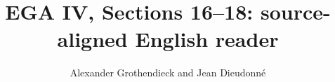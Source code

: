 
\setlength{\emergencystretch}{3em}



\title{EGA IV, Sections 16--18: source-aligned English reader}
\author{Alexander Grothendieck and Jean Dieudonn\'e}
\date{}
\maketitle
\tableofcontents

\setcounter{section}{15}





